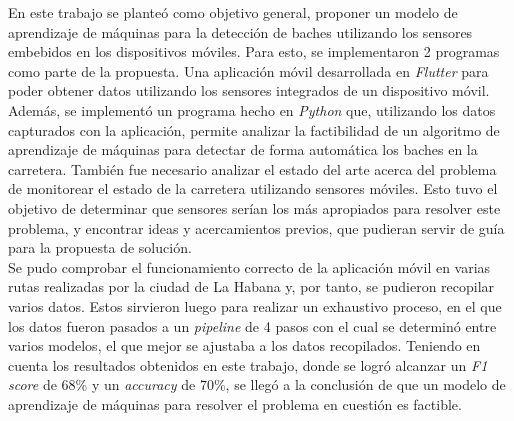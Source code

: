 \begin{conclusions}
	En este trabajo se planteó como objetivo general, proponer un modelo de aprendizaje de máquinas para la detección de baches
	utilizando los sensores embebidos en los dispositivos móviles. Para esto, se implementaron 2 programas como parte de la propuesta.
	Una aplicación móvil desarrollada en \emph{Flutter} para poder obtener datos utilizando los sensores integrados de un dispositivo
	móvil. Además, se implementó un programa hecho en \emph{Python} que, utilizando los datos capturados con la aplicación, 
	permite analizar la factibilidad de un algoritmo de aprendizaje de máquinas para detectar de forma automática los baches en 
	la carretera. También fue necesario analizar el estado del arte acerca del problema de monitorear el estado de la carretera 
	utilizando sensores móviles. Esto tuvo el objetivo de determinar que sensores serían los más apropiados para resolver este problema, 
	y encontrar ideas y acercamientos previos, que pudieran servir de guía para la propuesta de solución.\\

	Se pudo comprobar el funcionamiento correcto de la aplicación móvil en varias rutas realizadas por la ciudad de La Habana y, 
	por tanto, se pudieron recopilar varios datos. Estos sirvieron luego para realizar un exhaustivo proceso, en el que los datos 
	fueron pasados a un \emph{pipeline} de 4 pasos con el cual se determinó entre varios modelos, el que mejor se ajustaba a los
	datos recopilados. Teniendo en cuenta los resultados obtenidos en este trabajo, donde se logró alcanzar un \emph{F1 score} de
	68\% y un \emph{accuracy} de 70\%, se llegó a la conclusión de que un modelo de aprendizaje de máquinas para resolver el
	problema en cuestión es factible.
\end{conclusions}
